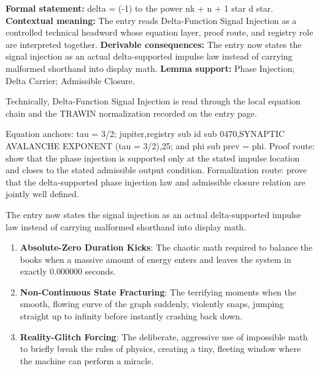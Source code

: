 \begingroup\footnotesize\setlength{\emergencystretch}{3em}\sloppy
\textbf{Formal statement:} delta = (-1) to the power nk + n + 1 star d star. \textbf{Contextual meaning:} The entry reads Delta-Function Signal Injection as a controlled technical headword whose equation layer, proof route, and registry role are interpreted together. \textbf{Derivable consequences:} The entry now states the signal injection as an actual delta-supported impulse law instead of carrying malformed shorthand into display math. \textbf{Lemma support:} Phase Injection; Delta Carrier; Admissible Closure.\par
\endgroup

Technically, Delta-Function Signal Injection is read through the local equation chain and the TRAWIN normalization recorded on the entry page.

Equation anchors: tau = 3/2; jupiter,registry sub id sub 0470,SYNAPTIC AVALANCHE EXPONENT (tau = 3/2),25; and phi sub prev = phi. Proof route: show that the phase injection is supported only at the stated impulse location and closes to the stated admissible output condition. Formalization route: prove that the delta-supported phase injection law and admissible closure relation are jointly well defined.

The entry now states the signal injection as an actual delta-supported impulse law instead of carrying malformed shorthand into display math.
\endgroup

\begin{enumerate}[leftmargin=1.6em,itemsep=6pt,topsep=4pt]
\item \textbf{Absolute-Zero Duration Kicks}: The chaotic math required to balance the books when a massive amount of energy enters and leaves the system in exactly 0.000000 seconds.
\item \textbf{Non-Continuous State Fracturing}: The terrifying moments when the smooth, flowing curve of the graph suddenly, violently snaps, jumping straight up to infinity before instantly crashing back down.
\item \textbf{Reality-Glitch Forcing}: The deliberate, aggressive use of impossible math to briefly break the rules of physics, creating a tiny, fleeting window where the machine can perform a miracle.
\end{enumerate}

